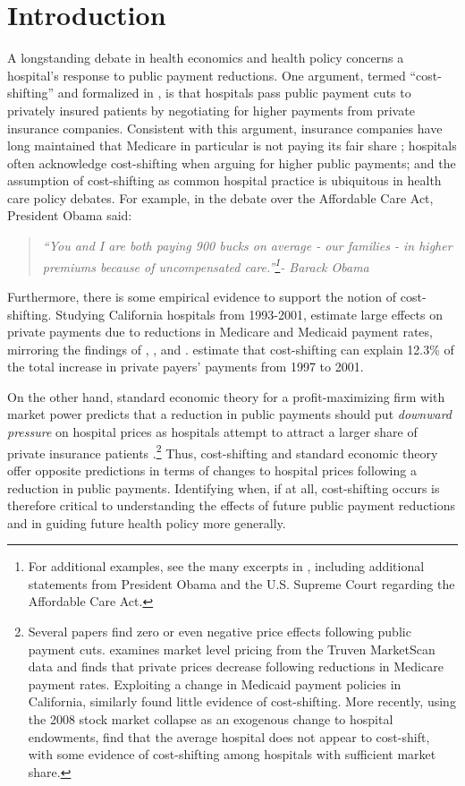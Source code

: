 \documentclass[12pt]{article}
\begin{document}
\newpage
\section{Introduction}
\doublespacing
A longstanding debate in health economics and health policy concerns a hospital's response to public payment reductions.  One argument, termed ``cost-shifting'' and formalized in \cite{dranove1988}, is that hospitals pass public payment cuts to privately insured patients by negotiating for higher payments from private insurance companies.  Consistent with this argument, insurance companies have long maintained that Medicare in particular is not paying its fair share \citep{frakt2011}; hospitals often acknowledge cost-shifting when arguing for higher public payments; and the assumption of cost-shifting as common hospital practice is ubiquitous in health care policy debates. For example, in the debate over the Affordable Care Act, President Obama said:
\begin{quote}
\textit{``You and I are both paying 900 bucks on average - our families - in higher premiums because of uncompensated care.''\footnote{For additional examples, see the many excerpts in \cite{dranove2017}, including additional statements from President Obama and the U.S. Supreme Court regarding the Affordable Care Act.}- Barack Obama}
\end{quote}
Furthermore, there is some empirical evidence to support the notion of cost-shifting. Studying California hospitals from 1993-2001, \cite{zwanziger2006} estimate large effects on private payments due to reductions in Medicare and Medicaid payment rates, mirroring the findings of \cite{lee2003}, \cite{zwanziger2000}, and \cite{cutler1998costshift}. \cite{zwanziger2006} estimate that cost-shifting can explain 12.3\% of the total increase in private payers' payments from 1997 to 2001.

On the other hand, standard economic theory for a profit-maximizing firm with market power predicts that a reduction in public payments should put \textit{downward pressure} on hospital prices as hospitals attempt to attract a larger share of private insurance patients \citep{hay1983}.\footnote{Several papers find zero or even negative price effects following public payment cuts. \cite{white2013} examines market level pricing from the Truven MarketScan data and finds that private prices decrease following reductions in Medicare payment rates. Exploiting a change in Medicaid payment policies in California, \citet{dranove1998} similarly found little evidence of cost-shifting. More recently, using the 2008 stock market collapse as an exogenous change to hospital endowments, \cite{dranove2017} find that the average hospital does not appear to cost-shift, with some evidence of cost-shifting among hospitals with sufficient market share.}  Thus, cost-shifting and standard economic theory offer opposite predictions in terms of changes to hospital prices following a reduction in public payments. Identifying when, if at all, cost-shifting occurs is therefore critical to understanding the effects of future public payment reductions and in guiding future health policy more generally.
\end{document}
